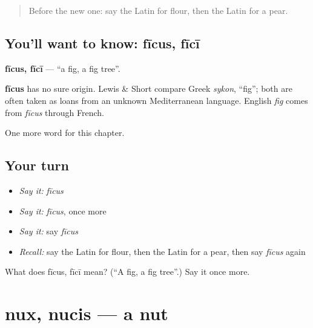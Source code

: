 \label{lesson:LA-C81-ficus}



\begin{quote}
Before the new one: say the Latin for flour, then the Latin for a pear.
\end{quote}

\subsection*{You'll want to know: fīcus, fīcī}
\textbf{fīcus, fīcī} — \textquotedblleft{}a fig, a fig tree\textquotedblright{}.

\begin{cousinweb}
\textbf{fīcus} has no sure origin. Lewis \& Short compare Greek \emph{sykon}, \textquotedblleft{}fig\textquotedblright{}; both are often taken as loans from an unknown Mediterranean language. English \emph{fig} comes from \emph{fīcus} through French.
\end{cousinweb}

\begin{grammarlens}[title={What you've built}]
One more word for this chapter.
\end{grammarlens}

\subsection*{Your turn}
\begin{itemize}
\raggedright
  \item \emph{Say it:} \emph{fīcus}
  \item \emph{Say it:} \emph{fīcus}, once more
  \item \emph{Say it:} say \emph{fīcus}
  \item \emph{Recall:} say the Latin for flour, then the Latin for a pear, then say \emph{fīcus} again
\end{itemize}

\begin{tcolorbox}[breakable,colback=teal!4,colframe=teal!35!black,title={Before you move on}]
What does fīcus, fīcī mean? (\textquotedblleft{}A fig, a fig tree\textquotedblright{}.) Say it once more.
\end{tcolorbox}
\section[nux, nucis]{nux, nucis — a nut}

\label{lesson:LA-C81-nux}



